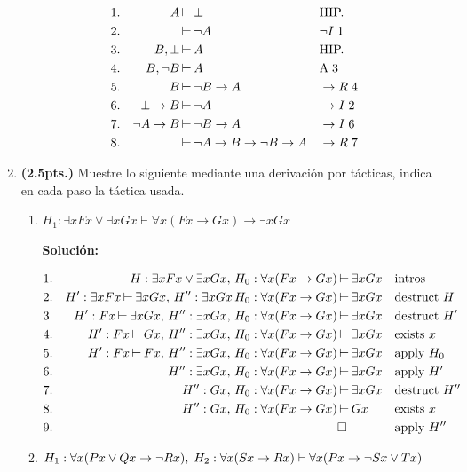 \documentclass[11pt,letterpaper]{article}
\newcommand{\coso}{\mathbin{\rotatebox[origin=c]{270}{$\perp$}}}
\begin{document}
\begin{enumerate}
  \begin{align*}
    1.& & A&\coso \bot & &\text{HIP.}\\
    2.& & &\coso \neg A & &\neg I\; 1\\
    3.& & B, \bot&\coso A & &\text{HIP.}\\
    4.& & B, \neg B&\coso A & &\text{A} \; 3\\
    5.& & B &\coso \neg B \rightarrow A & &\rightarrow R\; 4\\
    6.& & \bot \rightarrow B &\coso \neg A & &\rightarrow I\; 2\\
    7.& & \neg A \rightarrow B &\coso \neg B\rightarrow A & &\rightarrow I\; 6\\
    8.& & &\coso\neg A \rightarrow B \rightarrow \neg B\rightarrow A
    & &\rightarrow R\; 7\\
  \end{align*}
\ee  

\item \textbf{(2.5pts.)} Muestre lo siguiente mediante una derivación por 
tácticas, indica en cada paso la táctica usada.
\begin{enumerate}
 \item $H_1: \exists x Fx \lor \exists x Gx 
  \vdash \forall x (Fx \to Gx) \to \exists x Gx $

  \hfill\break
  {\bf Solución:}
  
  \begin{align*}
    1.& & H: \exists x Fx \lor \exists x Gx,\, H_0:\forall x (Fx \to Gx)
    &\coso \exists x Gx & &\text{intros}\\
    2.& & H': \exists x Fx\coso \exists x Gx,\, H'': \exists x Gx\, H_0:\forall x (Fx \to Gx)
    &\coso \exists x Gx & &\text{destruct } H\\
    3.& & H': Fx\coso \exists x Gx,\, H'': \exists x Gx,\, H_0:\forall x (Fx \to Gx)
    &\coso \exists x Gx & &\text{destruct } H'\\
    4.& & H': Fx\coso Gx,\, H'': \exists x Gx,\, H_0:\forall x (Fx \to Gx)
    &\coso \exists x Gx & &\text{exists } x\\
    5.& & H': Fx\coso Fx,\, H'': \exists x Gx,\, H_0:\forall x (Fx \to Gx)
    &\coso \exists x Gx & &\text{apply } H_0\\
    6.& & \, H'': \exists x Gx,\, H_0:\forall x (Fx \to Gx)
    &\coso \exists x Gx & &\text{apply } H'\\
    7.& & \, H'': Gx,\, H_0:\forall x (Fx \to Gx)
    &\coso \exists x Gx & &\text{destruct } H''\\
    8.& & \, H'': Gx,\, H_0:\forall x (Fx \to Gx)
    &\coso Gx & &\text{exists } x\\
    9.& & \, &\square & &\text{apply } H''\\
  \end{align*}
  \newpage
 \item $H_1: \forall x(Px\lor Qx\rightarrow\lnot Rx), \; H_2:\forall x(Sx \rightarrow Rx)
  \vdash\forall x(Px \rightarrow\lnot Sx\lor Tx)$
  

\end{enumerate}
\end{enumerate}
\end{document}
